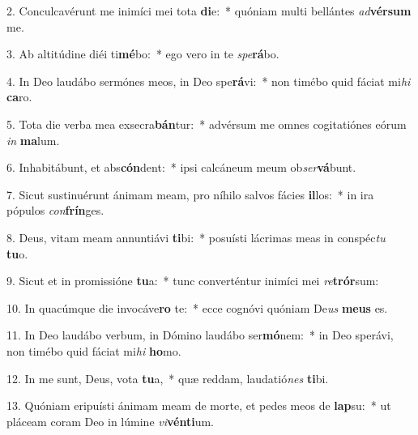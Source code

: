 2. Conculcavérunt me inimíci mei tota \textbf{di}e:~*  quóniam multi bellántes \textit{ad}\textbf{vér}\textbf{sum} me.\

3. Ab altitúdine diéi ti\textbf{mé}bo:~*  ego vero in te \textit{spe}\textbf{rá}bo.\

4. In Deo laudábo sermónes meos, in Deo spe\textbf{rá}vi:~*  non timébo quid fáciat mi\textit{hi} \textbf{ca}ro.\

5. Tota die verba mea exsecra\textbf{bán}tur:~*  advérsum me omnes cogitatiónes eórum \textit{in} \textbf{ma}lum.\

6. Inhabitábunt, et abs\textbf{cón}dent:~*  ipsi calcáneum meum ob\textit{ser}\textbf{vá}bunt.\

7. Sicut sustinuérunt ánimam meam, pro níhilo salvos fácies \textbf{il}los:~*  in ira pópulos \textit{con}\textbf{frín}ges.\

8. Deus, vitam meam annuntiávi \textbf{ti}bi:~*  posuísti lácrimas meas in conspéc\textit{tu} \textbf{tu}o.\

9. Sicut et in promissióne \textbf{tu}a:~*  tunc converténtur inimíci mei \textit{re}\textbf{trór}sum:\

10. In quacúmque die invocáve\textbf{ro} te:~*  ecce cognóvi quóniam De\textit{us} \textbf{me}\textbf{us} es.\

11. In Deo laudábo verbum, in Dómino laudábo ser\textbf{mó}nem:~*  in Deo sperávi, non timébo quid fáciat mi\textit{hi} \textbf{ho}mo.\

12. In me sunt, Deus, vota \textbf{tu}a,~*  quæ reddam, laudatió\textit{nes} \textbf{ti}bi.\

13. Quóniam eripuísti ánimam meam de morte, et pedes meos de \textbf{lap}su:~*  ut pláceam coram Deo in lúmine \textit{vi}\textbf{vén}\textbf{ti}um.\

